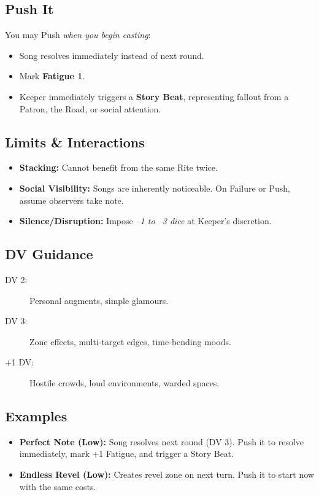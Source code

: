\subsection*{Push It}
You may Push \emph{when you begin casting}:
\begin{itemize}
\item Song resolves immediately instead of next round.
\item Mark \textbf{Fatigue 1}.
\item Keeper immediately triggers a \textbf{Story Beat}, representing fallout from a Patron, the Road, or social attention.
\end{itemize}

\subsection*{Limits \& Interactions}
\begin{itemize}
\item \textbf{Stacking:} Cannot benefit from the same Rite twice.
\item \textbf{Social Visibility:} Songs are inherently noticeable. On Failure or Push, assume observers take note.
\item \textbf{Silence/Disruption:} Impose \emph{–1 to –3 dice} at Keeper’s discretion.
\end{itemize}

\subsection*{DV Guidance}
\label{talent:cantors-path-dv}
\begin{description}
\item[DV 2:] Personal augments, simple glamours.
\item[DV 3:] Zone effects, multi-target edges, time-bending moods.
\item[+1 DV:] Hostile crowds, loud environments, warded spaces.
\end{description}

\subsection*{Examples}
\begin{itemize}
\item \textbf{Perfect Note (Low):} Song resolves next round (DV 3). Push it to resolve immediately, mark +1 Fatigue, and trigger a Story Beat.
\item \textbf{Endless Revel (Low):} Creates revel zone on next turn. Push it to start now with the same costs.
\end{itemize}